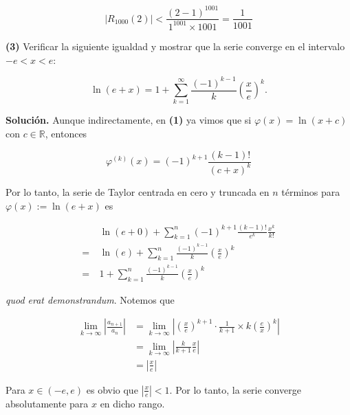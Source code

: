 \documentclass[12pt]{article}
\begin{document}
\begin{equation*}
    \left| R_{1000}(2) \right| < \frac{(2-1)^{1001}}{1^{1001} \times 1001} =
    \frac{1}{1001}
\end{equation*}

\pagebreak 

\begin{myframe}
    \textbf{(3)} Verificar la siguiente igualdad y mostrar que la serie converge en el
    intervalo $-e < x < e$:
   
    \begin{equation*}
    \ln(e+x) = 1 + \sum_{k=1}^{\infty} \frac{(-1)^{k-1}}{k} \left( \frac{x}{e} \right)^k.
    \end{equation*}
\end{myframe}

\textbf{Solución.} Aunque indirectamente, en \textbf{(1)} ya vimos que si
$\varphi(x) = \ln(x+c)$ con $c \in \mathbb{R}$, entonces

\begin{equation*}
    \varphi^{(k)}(x) = (-1)^{k+1} \frac{(k-1)!}{(c+x)^k}
\end{equation*}

Por lo tanto, la serie de Taylor centrada en cero y truncada en $n$ términos
para $\varphi(x) := \ln(e+x)$ es

\begin{align*}
    &\ln(e+0) + \sum_{k=1}^n (-1)^{k+1} \frac{(k-1)!}{e^k} \frac{x^k}{k!} \\ 
    = ~ &\ln(e) + \sum_{k=1}^n \frac{ (-1)^{k-1} }{k} \left( \frac{x}{e} \right)^k \\ 
    = ~ &1 + \sum_{k=1}^n \frac{ (-1)^{k-1} }{k} \left( \frac{x}{e} \right)^k
\end{align*}

\textit{quod erat demonstrandum}. Notemos que 

\begin{align*}
    \lim_{k \to \infty} \left| \frac{a_{n+1}}{a_n} \right| 
    &= \lim_{k \to \infty} \left| \left( \frac{x}{e} \right)^{k+1} \cdot \frac{1}{k+1}
    \times k \left( \frac{e}{x} \right)^k \right|\\ 
    &= \lim_{k \to \infty} \left| \frac{k}{k+1} \frac{x}{e} \right|  \\ 
    &= \left| \frac{x}{e} \right| 
\end{align*}

Para $x \in (-e, e)$ es obvio que $\left| \frac{x}{e} \right|  < 1$. Por lo
tanto, la serie converge absolutamente para $x$ en dicho rango.
\end{document}
